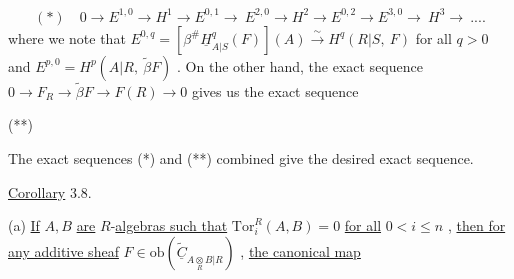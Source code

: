 \begin{equation*}
(*)\quad 0 \to E^{1,0} \to H^{1} \to E^{0,1}\!\to\ E^{2,0} \to H^{2} \to E^{0,2} \to E^{3,0}\!\to\ H^{3} \to\ ....
\end{equation*}
where we note that  $E^{0,q} = [\beta^{\#}\underline{H}^{q}_{A|S}(F)](A) \overset{\sim}{\to} H^{q}(R|S,\ F)$  for all  $q > 0$  and $E^{p,0} = H^{p}(A|R,\ \widetilde{\beta}F)$ . On the other hand, the exact sequence  $0 \to F_{R} \to \widetilde{\beta}F \to F(R) \to 0$ gives us the exact sequence

{\footnotesize (**)\quad{}}
The exact sequences (*) and (**) combined give the desired exact sequence.



\underline{Corollary} 3.8.

(a)  \underline{If}  $A, B$  \underline{are} $R$-\underline{algebras such that}  $\mathrm{Tor}^{R}_{i}(A, B) = 0$  \underline{for all} $0 < i \leq n$  , \underline{then for any additive sheaf}  $F \in \mathrm{ob}(\widetilde{\underline{C}}_{A\underset{R}{\otimes}B|R})$  , \underline{the canonical map}

